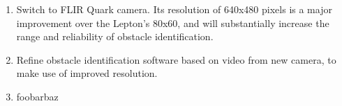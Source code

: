 \begin{enumerate}
  \item Switch to FLIR Quark camera.  Its resolution of 640x480 pixels is a major improvement over the Lepton's 80x60, and will substantially increase the range and reliability of obstacle identification.
  \item Refine obstacle identification software based on video from new camera, to make use of improved resolution.
  \item foobarbaz
\end{enumerate}
